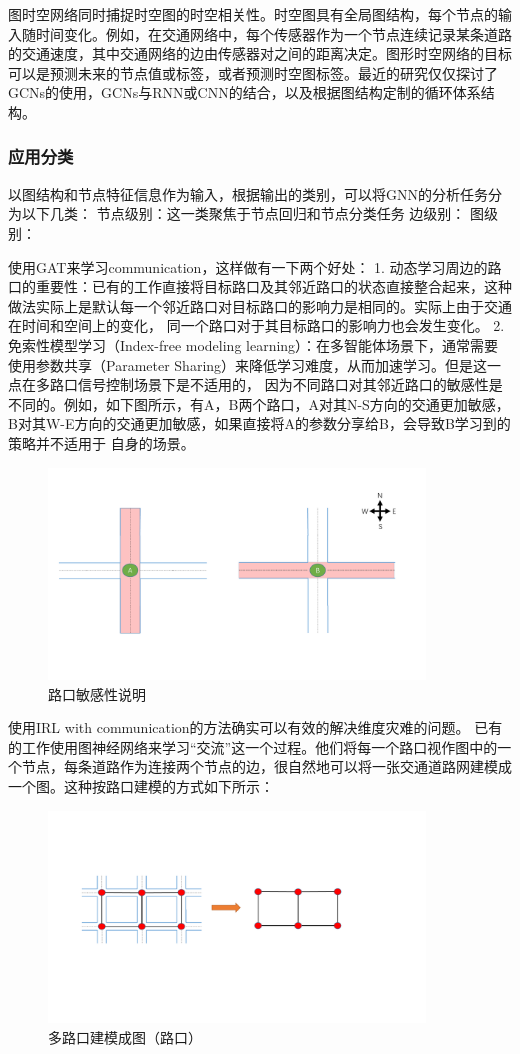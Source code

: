 图时空网络同时捕捉时空图的时空相关性。时空图具有全局图结构，每个节点的输入随时间变化。例如，在交通网络中，每个传感器作为一个节点连续记录某条道路的交通速度，其中交通网络的边由传感器对之间的距离决定。图形时空网络的目标可以是预测未来的节点值或标签，或者预测时空图标签。最近的研究仅仅探讨了GCNs的使用，GCNs与RNN或CNN的结合，以及根据图结构定制的循环体系结构。

\subsubsection{应用分类}
以图结构和节点特征信息作为输入，根据输出的类别，可以将GNN的分析任务分为以下几类：
节点级别：这一类聚焦于节点回归和节点分类任务
边级别：
图级别：


使用GAT来学习communication，这样做有一下两个好处：
1. 动态学习周边的路口的重要性：已有的工作直接将目标路口及其邻近路口的状态直接整合起来，这种做法实际上是默认每一个邻近路口对目标路口的影响力是相同的。实际上由于交通在时间和空间上的变化，
同一个路口对于其目标路口的影响力也会发生变化。
2. 免索性模型学习（Index-free modeling learning）：在多智能体场景下，通常需要使用参数共享（Parameter Sharing）来降低学习难度，从而加速学习。但是这一点在多路口信号控制场景下是不适用的，
因为不同路口对其邻近路口的敏感性是不同的。例如，如下图所示，有A，B两个路口，A对其N-S方向的交通更加敏感，B对其W-E方向的交通更加敏感，如果直接将A的参数分享给B，会导致B学习到的策略并不适用于
自身的场景。
\begin{figure}[htb]
  \includegraphics[width=10cm]{ppt/index-free.pdf}
  \caption{路口敏感性说明}
  \label{fig:index-free}
\end{figure}

使用IRL with communication的方法确实可以有效的解决维度灾难的问题。
已有的工作使用图神经网络来学习“交流”这一个过程。他们将每一个路口视作图中的一个节点，每条道路作为连接两个节点的边，很自然地可以将一张交通道路网建模成一个图。这种按路口建模的方式如下所示：
\begin{figure}[htb]
  \includegraphics[width=10cm]{ppt/network-graph.pdf}
  \caption{多路口建模成图（路口）}
  \label{fig:network-graph-old}
\end{figure}

